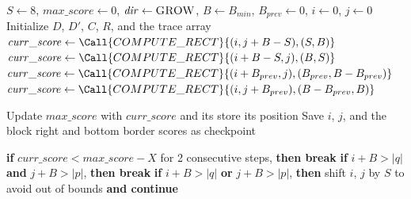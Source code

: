 \vfill\clearpage
\begin{algorithm}[H]
\caption{Pseudocode for the Block Aligner algorithm.}
\label{alg:adaptive-block-alignment}
\footnotesize
\begin{algorithmic}[1]
    \State $S\gets8$, $\mathit{max\_score}\gets0$, $\mathit{dir}\gets\textsc{GROW}$,
      $B\gets B_{min}$, $B_{prev}\gets0$, $i\gets0$, $j\gets0$
    \State Initialize $D$, $D'$, $C$, $R$, and the trace array
        \State $\mathit{curr\_score}\gets\Call{COMPUTE\_RECT}{(i,j+B-S),(S,B)}$
        \State $\mathit{curr\_score}\gets\Call{COMPUTE\_RECT}{(i+B-S,j),(B,S)}$
        \State $\mathit{curr\_score}\gets\Call{COMPUTE\_RECT}{(i+B_{prev},j),(B_{prev},B-B_{prev})}$
        \State $\mathit{curr\_score}\gets\Call{COMPUTE\_RECT}{(i,j+B_{prev}),(B-B_{prev},B)}$
      \EndIf
      \State \strut
        \State Update $\mathit{max\_score}$ with $\mathit{curr\_score}$ and its store its position
        \State Save $i$, $j$, and the block right and bottom border scores as checkpoint
      \EndIf
      \State \strut
      \State \textbf{if} $\mathit{curr\_score}<\mathit{max\_score}-X$ for 2 consecutive steps, \textbf{then break}
      \State \textbf{if} $i+B>|q|$ \textbf{and} $j+B>|p|$, \textbf{then break}
      \State \textbf{if} $i+B>|q|$ \textbf{or} $j+B>|p|$, \textbf{then} shift $i$, $j$ by $S$ to avoid out of bounds \textbf{and continue}
      \State \strut

\end{algorithmic}
\end{algorithm}
